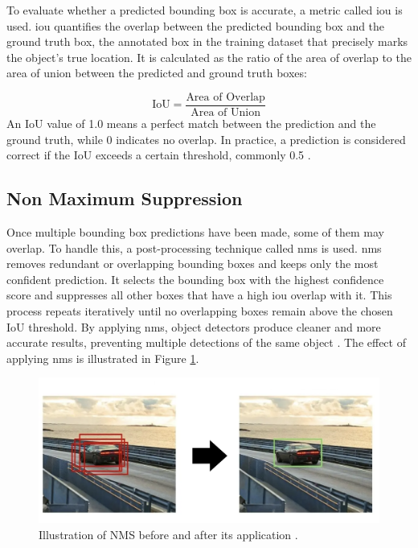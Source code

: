 To evaluate whether a predicted bounding box is accurate, a metric called \gls{iou} is used. \gls{iou} quantifies the overlap between the predicted bounding box and the ground truth box, the annotated box in the training dataset that precisely marks the object's true location. It is calculated as the ratio of the area of overlap to the area of union between the predicted and ground truth boxes:

\[
\text{IoU} = \frac{\text{Area of Overlap}}{\text{Area of Union}}
\]
An IoU value of 1.0 means a perfect match between the prediction and the ground truth, while 0 indicates no overlap. In practice, a prediction is considered correct if the IoU exceeds a certain threshold, commonly 0.5 \cite{ultralytics:iou}. \\

\subsection{Non Maximum Suppression}

 Once multiple bounding box predictions have been made, some of them may overlap. To handle this, a post-processing technique called \gls{nms} is used. \gls{nms} removes redundant or overlapping bounding boxes and keeps only the most confident prediction. It selects the bounding box with the highest confidence score and suppresses all other boxes that have a high \gls{iou} overlap with it. This process repeats iteratively until no overlapping boxes remain above the chosen IoU threshold. By applying \gls{nms}, object detectors produce cleaner and more accurate results, preventing multiple detections of the same object
\cite{thepythoncode:nms}. The effect of applying \gls{nms} is illustrated in Figure \ref{fig:nms}.

\begin{figure}[h!]
    \centering
    \includegraphics[width=0.75\linewidth]{figures/theory/image-recognition/nms.png}
    \caption[NMS before and after]{Illustration of NMS before and after its application \cite{thepythoncode:nms}.}
    \label{fig:nms}
\end{figure}

